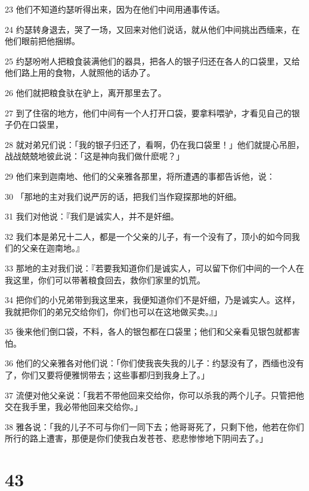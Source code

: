 \par 23 他们不知道约瑟听得出来，因为在他们中间用通事传话。
\par 24 约瑟转身退去，哭了一场，又回来对他们说话，就从他们中间挑出西缅来，在他们眼前把他捆绑。
\par 25 约瑟吩咐人把粮食装满他们的器具，把各人的银子归还在各人的口袋里，又给他们路上用的食物，人就照他的话办了。
\par 26 他们就把粮食驮在驴上，离开那里去了。
\par 27 到了住宿的地方，他们中间有一个人打开口袋，要拿料喂驴，才看见自己的银子仍在口袋里，
\par 28 就对弟兄们说：「我的银子归还了，看啊，仍在我口袋里！」他们就提心吊胆，战战兢兢地彼此说：「这是神向我们做什麽呢？」
\par 29 他们来到迦南地、他们的父亲雅各那里，将所遭遇的事都告诉他，说：
\par 30 「那地的主对我们说严厉的话，把我们当作窥探那地的奸细。
\par 31 我们对他说：『我们是诚实人，并不是奸细。
\par 32 我们本是弟兄十二人，都是一个父亲的儿子，有一个没有了，顶小的如今同我们的父亲在迦南地。』
\par 33 那地的主对我们说：『若要我知道你们是诚实人，可以留下你们中间的一个人在我这里，你们可以带著粮食回去，救你们家里的饥荒。
\par 34 把你们的小兄弟带到我这里来，我便知道你们不是奸细，乃是诚实人。这样，我就把你们的弟兄交给你们，你们也可以在这地做买卖。』」
\par 35 後来他们倒口袋，不料，各人的银包都在口袋里；他们和父亲看见银包就都害怕。
\par 36 他们的父亲雅各对他们说：「你们使我丧失我的儿子：约瑟没有了，西缅也没有了，你们又要将便雅悯带去；这些事都归到我身上了。」
\par 37 流便对他父亲说：「我若不带他回来交给你，你可以杀我的两个儿子。只管把他交在我手里，我必带他回来交给你。」
\par 38 雅各说：「我的儿子不可与你们一同下去；他哥哥死了，只剩下他，他若在你们所行的路上遭害，那便是你们使我白发苍苍、悲悲惨惨地下阴间去了。」

\chapter{43}

